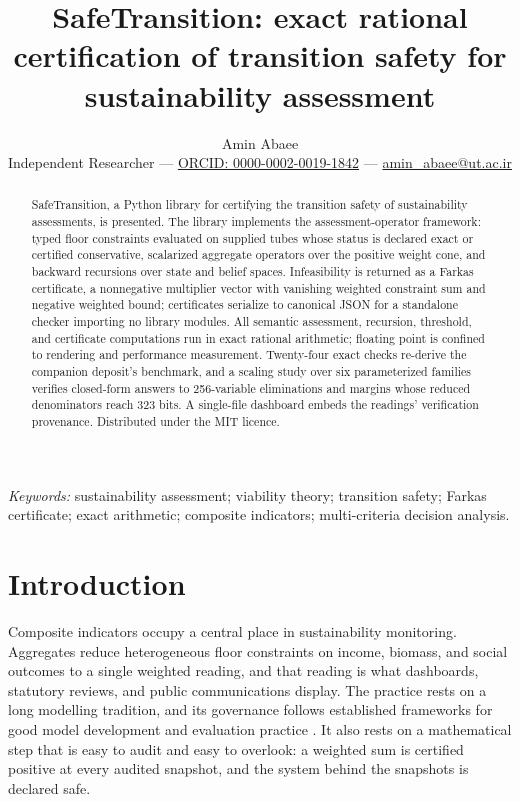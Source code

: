 \documentclass[11pt]{article}
\title{SafeTransition: exact rational certification of transition safety for
sustainability assessment}
\author{Amin Abaee\\[2pt]
\small Independent Researcher ---
\href{https://orcid.org/0000-0002-0019-1842}{ORCID: 0000-0002-0019-1842} ---
\href{mailto:amin\_abaee@ut.ac.ir}{amin\_abaee@ut.ac.ir}}
\date{}
\begin{document}
\maketitle

\begin{abstract}
SafeTransition, a Python library for certifying the transition safety of
sustainability assessments, is presented. The library implements the
assessment-operator framework: typed floor constraints evaluated on
supplied tubes whose status is declared exact or certified conservative,
scalarized aggregate operators over the positive weight cone, and backward
recursions over state and belief spaces. Infeasibility is returned as a
Farkas certificate, a nonnegative multiplier vector with vanishing
weighted constraint sum and negative weighted bound; certificates
serialize to canonical JSON for a standalone checker importing no
library modules. All semantic assessment, recursion, threshold, and
certificate computations run in exact rational arithmetic; floating point
is confined to rendering and performance measurement. Twenty-four exact
checks re-derive the companion deposit's benchmark, and a scaling study
over six parameterized families verifies closed-form answers to
256-variable eliminations and margins whose reduced denominators reach
323 bits. A single-file dashboard embeds the readings' verification
provenance. Distributed under the MIT licence.
\end{abstract}

\noindent\textit{Keywords:} sustainability assessment; viability theory;
transition safety; Farkas certificate; exact arithmetic; composite
indicators; multi-criteria decision analysis.


\section{Introduction}\label{sec:introduction}

Composite indicators occupy a central place in sustainability monitoring.
Aggregates reduce heterogeneous floor constraints on income, biomass, and
social outcomes to a single weighted reading, and that reading is what
dashboards, statutory reviews, and public communications display. The
practice rests on a long modelling tradition, and its governance follows
established frameworks for good model development and evaluation practice
\citep{Jakeman2006}. It also rests on a mathematical step that
is easy to audit and easy to overlook: a weighted sum is certified positive
at every audited snapshot, and the system behind the snapshots is declared
safe.
\end{document}
